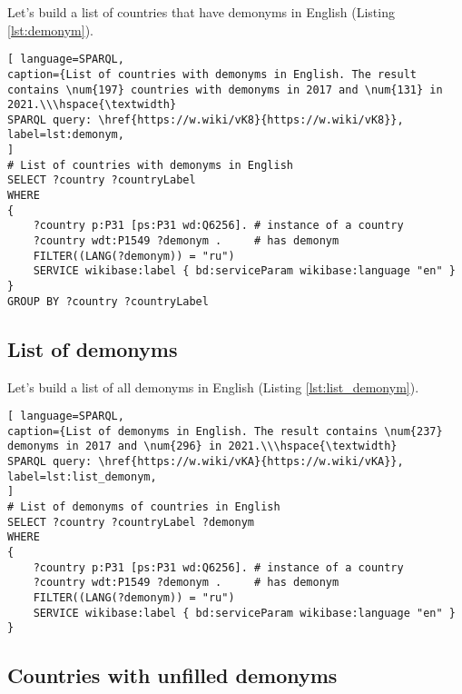 Let's build a list of countries that have demonyms in English (Listing \ref{lst:demonym}).

\begin{lstlisting}[ language=SPARQL, 
caption={List of countries with demonyms in English. The result contains \num{197} countries with demonyms in 2017 and \num{131} in 2021.\\\hspace{\textwidth}
SPARQL query: \href{https://w.wiki/vK8}{https://w.wiki/vK8}},
label=lst:demonym, 
]
# List of countries with demonyms in English
SELECT ?country ?countryLabel 
WHERE
{
	?country p:P31 [ps:P31 wd:Q6256]. # instance of a country
	?country wdt:P1549 ?demonym .     # has demonym
	FILTER((LANG(?demonym)) = "ru")
	SERVICE wikibase:label { bd:serviceParam wikibase:language "en" }
}
GROUP BY ?country ?countryLabel
\end{lstlisting}



\subsection{List of demonyms}

Let's build a list of all demonyms in English (Listing \ref{lst:list_demonym}).

\begin{lstlisting}[ language=SPARQL, 
caption={List of demonyms in English. The result contains \num{237} demonyms in 2017 and \num{296} in 2021.\\\hspace{\textwidth}
SPARQL query: \href{https://w.wiki/vKA}{https://w.wiki/vKA}},
label=lst:list_demonym, 
]
# List of demonyms of countries in English
SELECT ?country ?countryLabel ?demonym
WHERE
{
	?country p:P31 [ps:P31 wd:Q6256]. # instance of a country
	?country wdt:P1549 ?demonym .     # has demonym
	FILTER((LANG(?demonym)) = "ru")
	SERVICE wikibase:label { bd:serviceParam wikibase:language "en" }
}
\end{lstlisting}



\subsection{Countries with unfilled demonyms}

